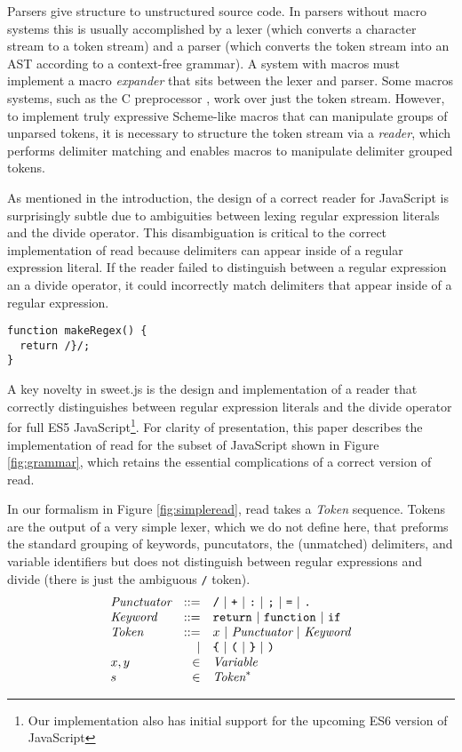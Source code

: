 \documentclass[preprint,10pt]{sigplanconf}
\begin{document}
Parsers give structure to unstructured source code. In parsers without
macro systems this is usually accomplished by a lexer (which converts
a character stream to a token stream) and a parser (which converts the
token stream into an AST according to a context-free grammar). A
system with macros must implement a macro \emph{expander} that sits
between the lexer and parser. Some macros systems, such as the C
preprocessor \cite{Harbison1984}, work over just the token stream.
However, to implement truly
expressive Scheme-like macros that can manipulate groups of unparsed
tokens, it is necessary to structure the token stream via a
\emph{reader}, which performs delimiter matching and enables macros to manipulate delimiter grouped tokens.

As mentioned in the introduction, the design of a correct reader for JavaScript is surprisingly subtle due to ambiguities between lexing regular expression literals and the divide operator. This disambiguation is critical to the correct implementation of read because delimiters can appear inside of a regular expression literal. If the reader failed to distinguish between a regular expression an a divide operator, it could incorrectly match delimiters that appear inside of a regular expression.
\begin{lstlisting}
function makeRegex() {
  return /}/;  
}
\end{lstlisting}

A key novelty in sweet.js is the design and implementation of a
reader that correctly distinguishes between regular expression literals and the divide operator for full ES5 JavaScript\footnote{Our implementation
  also has initial support for the upcoming ES6 version of
  JavaScript}. For clarity of presentation, this paper describes the
implementation of read for the subset of JavaScript shown in Figure
\ref{fig:grammar}, which retains the essential complications of a
correct version of read.

In our formalism in Figure \ref{fig:simpleread}, read takes a \textit{Token} sequence. Tokens are the output of a very simple lexer, which we do not define here, that preforms the standard grouping of keywords, puncutators, the (unmatched) delimiters, and variable identifiers but does not distinguish between regular expressions and divide (\ie there is just the ambiguous \texttt{/} token).
\[
\begin{array}{lrl}
  \textit{Punctuator} &::=& \texttt{/} ~|~ \texttt{+} ~|~ \texttt{:} ~|~
  \texttt{;} ~|~ \texttt{=} ~|~ \texttt{.}
  \\
  \textit{Keyword} &::=& \texttt{return} ~|~ \texttt{function}~|~ \texttt{if}
  \\
  \textit{Token} &::=& x ~|~ \textit{Punctuator} ~|~ \textit{Keyword}
  \\
  &|& \texttt{\{} ~|~ \texttt{(} ~|~ \texttt {\}} ~|~  \texttt{)}
  \\
  x, y &\in& \textit{Variable}
  \\
  s &\in& \textit{Token}^{*}
 \end{array}
\]
\end{document}
